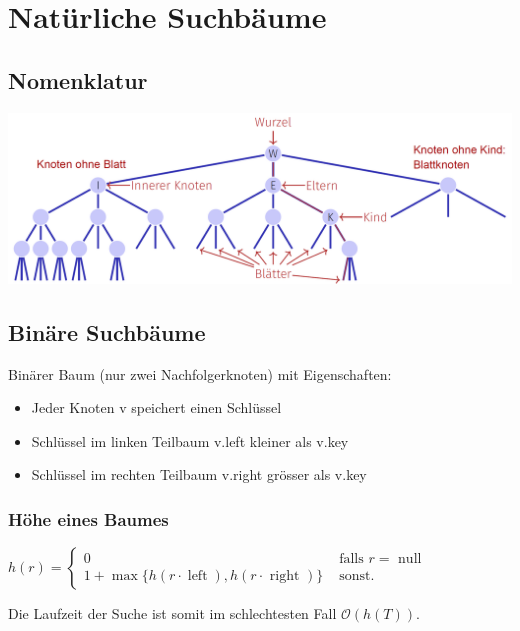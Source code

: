 \section{Natürliche Suchbäume}

\begin{sectionbox}
\subsection{Nomenklatur}
\begin{center}
    \includegraphics[width = \columnwidth]{../img/BaumNomen.png}
\end{center}
\end{sectionbox}
\begin{sectionbox}
  \subsection{Binäre Suchbäume}\smallskip
  Binärer Baum (nur zwei Nachfolgerknoten) mit Eigenschaften:\par
  \begin{itemize}
      \item Jeder Knoten v speichert einen Schlüssel
      \item Schlüssel im linken Teilbaum v.left kleiner als v.key
      \item Schlüssel im rechten Teilbaum v.right grösser als v.key
  \end{itemize}\vspace{7px}
  
  \subsubsection{Höhe eines Baumes}\smallskip
  $h(r)=\left\{\begin{array}{ll}0 & \text { falls } r=\text { null } \\ 1+\max \{h(r \cdot \operatorname{left}), h(r \cdot \text { right })\} & \text { sonst. }\end{array}\right.$\par\smallskip
  Die Laufzeit der Suche ist somit im schlechtesten Fall $\mathcal{O}(h(T))$.\par\smallskip
  \end{sectionbox}
  
